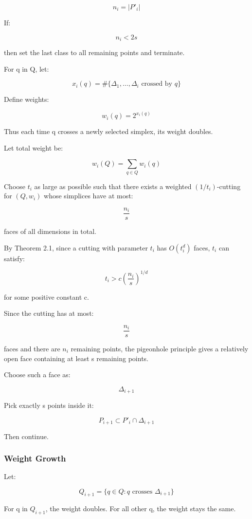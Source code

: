 \documentclass[
  11pt,
]{article}
\begin{document}
\[
n_i=|P'_i|
\]

If:

\[
n_i<2s
\]

then set the last class to all remaining points and terminate.

For q in Q, let:

\[
x_i(q)=\#\lbrace \Delta_1,\ldots,\Delta_i\text{ crossed by }q \rbrace
\]

Define weights:

\[
w_i(q)=2^{x_i(q)}
\]

Thus each time q crosses a newly selected simplex, its weight doubles.

Let total weight be:

\[
w_i(Q)=\sum_{q\in Q}w_i(q)
\]

Choose \(t_i\) as large as possible such that there exists a weighted
\((1/t_i)\)-cutting for \((Q,w_i)\) whose simplices have at most:

\[
\frac{n_i}{s}
\]

faces of all dimensions in total.

By Theorem 2.1, since a cutting with parameter \(t_i\) has \(O(t_i^d)\)
faces, \(t_i\) can satisfy:

\[
t_i>c\left(\frac{n_i}{s}\right)^{1/d}
\]

for some positive constant c.

Since the cutting has at most:

\[
\frac{n_i}{s}
\]

faces and there are \(n_i\) remaining points, the pigeonhole principle
gives a relatively open face containing at least s remaining points.

Choose such a face as:

\[
\Delta_{i+1}
\]

Pick exactly s points inside it:

\[
P_{i+1}\subset P'_i\cap\Delta_{i+1}
\]

Then continue.

\hypertarget{weight-growth}{%
\subsubsection{Weight Growth}\label{weight-growth}}

Let:

\[
Q_{i+1}=\lbrace q\in Q:q\text{ crosses }\Delta_{i+1} \rbrace
\]

For q in \(Q_{i+1}\), the weight doubles. For all other q, the weight
stays the same.
\end{document}
